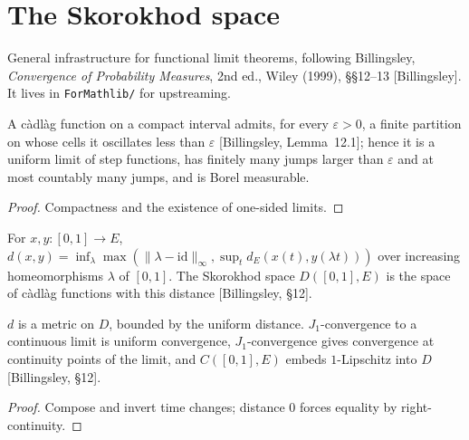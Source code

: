 \chapter{The Skorokhod space}
\label{chap:skorokhod}

General infrastructure for functional limit theorems, following Billingsley, \emph{Convergence of
Probability Measures}, 2nd ed., Wiley (1999), \S\S12--13 [Billingsley]. It lives in \texttt{ForMathlib/}
for upstreaming.

\begin{lemma}
  \label{lem:cadlag}
  \leanok
  A c\`adl\`ag function on a compact interval admits, for every $\varepsilon > 0$, a finite partition on whose cells it
  oscillates less than $\varepsilon$ [Billingsley, Lemma~12.1]; hence it is a uniform limit of step functions, has
  finitely many jumps larger than $\varepsilon$ and at most countably many jumps, and is Borel measurable.
\end{lemma}
\begin{proof}
  \leanok
  Compactness and the existence of one-sided limits.
\end{proof}

\begin{definition}
  \label{def:skorokhod}
  \leanok
  For $x, y \colon [0,1] \to E$, $d(x, y) = \inf_\lambda \max(\|\lambda - \mathrm{id}\|_\infty, \sup_t d_E(x(t), y(\lambda t)))$ over
  increasing homeomorphisms $\lambda$ of $[0,1]$. The Skorokhod space $D([0,1], E)$ is the space of c\`adl\`ag functions
  with this distance [Billingsley, \S12].
\end{definition}

\begin{theorem}[$J_1$ is a metric]
  \label{thm:skorokhod-metric}
  \leanok
  $d$ is a metric on $D$, bounded by the uniform distance. $J_1$-convergence to a continuous limit is uniform
  convergence, $J_1$-convergence gives convergence at continuity points of the limit, and $C([0,1], E)$ embeds
  $1$-Lipschitz into $D$ [Billingsley, \S12].
\end{theorem}
\begin{proof}
  \leanok
  Compose and invert time changes; distance $0$ forces equality by right-continuity.
\end{proof}

